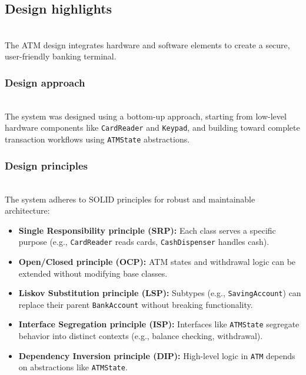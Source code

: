 \subsection{Design highlights}\label{vWbdyYFMW6bGOtneXPd5a}
\\
The ATM design integrates hardware and software elements to create a secure, user-friendly banking terminal.

\subsubsection{Design approach}\label{xN_l-7IQEFq1XtOZelSJQ}
\\
The system was designed using a bottom-up approach, starting from low-level hardware components like \texttt{CardReader} and \texttt{Keypad}, and building toward complete transaction workflows using \texttt{ATMState} abstractions.

\subsubsection{Design principles}\label{H08IyDxn2WAQn69f_YhyK}
\\
The system adheres to SOLID principles for robust and maintainable architecture:

\begin{itemize}
\item
\protect{}\label{sdqqxKKu6KgEOA7JkasKS}
\textbf{Single Responsibility principle (SRP):} Each class serves a specific purpose (e.g., \texttt{CardReader} reads cards, \texttt{CashDispenser} handles cash).
\item
\protect{}\label{8mKUEhPVtALlVFGRfPq5J}
\textbf{Open/Closed principle (OCP):} ATM states and withdrawal logic can be extended without modifying base classes.
\item
\protect{}\label{4tqUBUbaRR3TiGuZBTaMy}
\textbf{Liskov Substitution principle (LSP):} Subtypes (e.g., \texttt{SavingAccount}) can replace their parent \texttt{BankAccount} without breaking functionality.
\item
\protect{}\label{O1eFSiwY2WoeNII3Dw2g_}
\textbf{Interface Segregation principle (ISP):} Interfaces like \texttt{ATMState} segregate behavior into distinct contexts (e.g., balance checking, withdrawal).
\item
\protect{}\label{P6vhBaDEyKRZ-dF-LRA0j}
\textbf{Dependency Inversion principle (DIP):} High-level logic in \texttt{ATM} depends on abstractions like \texttt{ATMState}.
\end{itemize}

